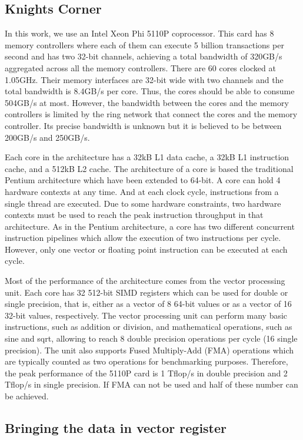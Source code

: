 \documentclass[10pt,conference,compsocconf]{IEEEtran}
\begin{document}
\subsection{Knights Corner}

In this work, we use an Intel Xeon Phi 5110P coprocessor. This card
has 8 memory controllers where each of them can execute 5 billion
transactions per second and has two 32-bit channels, achieving a total
bandwidth of 320GB/s aggregated across all the memory
controllers. There are 60 cores clocked at 1.05GHz. Their memory
interfaces are 32-bit wide with two channels and the total bandwidth
is 8.4GB/s per core. Thus, the cores should be able to consume 504GB/s
at most. However, the bandwidth between the cores and the memory
controllers is limited by the ring network that connect the cores and
the memory controller. Its precise bandwidth is unknown but it is
believed to be between 200GB/s and 250GB/s.

Each core in the architecture has a 32kB L1 data cache, a 32kB L1
instruction cache, and a 512kB L2 cache. The architecture of a core is
based the traditional Pentium architecture which have been extended to
64-bit. A core can hold 4 hardware contexts at any time. And at each
clock cycle, instructions from a single thread are executed. Due to
some hardware constraints, two hardware contexts must be used to reach
the peak instruction throughput in that architecture. As in the
Pentium architecture, a core has two different concurrent instruction
pipelines which allow the execution of two instructions per
cycle. However, only one vector or floating point instruction can be
executed at each cycle.

Most of the performance of the architecture comes from the vector
processing unit. Each core has 32 512-bit SIMD registers which can be
used for double or single precision, that is, either as a vector of 8
64-bit values or as a vector of 16 32-bit values, respectively. The
vector processing unit can perform many basic instructions, such as
addition or division, and mathematical operations, such as sine and
sqrt, allowing to reach 8 double precision operations per cycle (16
single precision). The unit also supports Fused Multiply-Add (FMA)
operations which are typically counted as two operations for
benchmarking purposes. Therefore, the peak performance of the 5110P
card is 1 Tflop/s in double precision and 2 Tflop/s in single
precision. If FMA can not be used and half of these number can be
achieved.


\subsection{Bringing the data in vector register}
\end{document}
